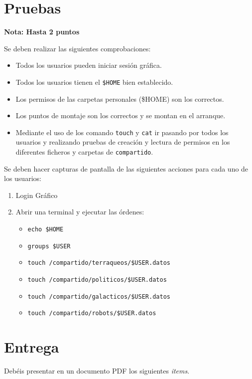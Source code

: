 \documentclass[11pt]{article}
\begin{document}
\section{Pruebas}
\label{sec:orge7d935f}

\textbf{Nota: Hasta 2 puntos}

Se deben realizar las siguientes comprobaciones:

\begin{itemize}
\item Todos los usuarios pueden iniciar sesión gráfica.
\item Todos los usuarios tienen el \texttt{\$HOME} bien establecido.
\item Los permisos de las carpetas personales (\$HOME) son los correctos.
\item Los puntos de montaje son los correctos y se montan en el arranque.
\item Mediante el uso de los comando \texttt{touch} y \texttt{cat} ir pasando por todos los usuarios y
realizando pruebas de creación y lectura de permisos en los diferentes
ficheros y carpetas de \texttt{compartido}.
\end{itemize}


Se deben hacer capturas de pantalla de las siguientes acciones para cada uno
de los usuarios:

\begin{enumerate}
\item Login Gráfico
\item Abrir una terminal y ejecutar las órdenes:
\begin{itemize}
\item \texttt{echo \$HOME}
\item \texttt{groups \$USER}
\item \texttt{touch /compartido/terraqueos/\$USER.datos}
\item \texttt{touch /compartido/politicos/\$USER.datos}
\item \texttt{touch /compartido/galacticos/\$USER.datos}
\item \texttt{touch /compartido/robots/\$USER.datos}
\end{itemize}
\end{enumerate}

\section{Entrega}
\label{sec:orgeb07752}

Debéis presentar en un documento PDF los siguientes \emph{items}.
\end{document}

